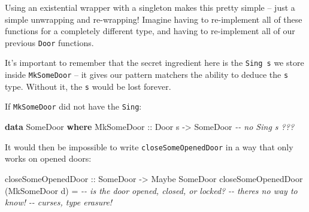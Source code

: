 \documentclass[]{article}
\newenvironment{Shaded}{}{}
\newcommand{\CommentTok}[1]{\textcolor[rgb]{0.38,0.63,0.69}{\textit{#1}}}
\newcommand{\DataTypeTok}[1]{\textcolor[rgb]{0.56,0.13,0.00}{#1}}
\newcommand{\KeywordTok}[1]{\textcolor[rgb]{0.00,0.44,0.13}{\textbf{#1}}}
\newcommand{\NormalTok}[1]{#1}
\newcommand{\OperatorTok}[1]{\textcolor[rgb]{0.40,0.40,0.40}{#1}}
\newcommand{\OtherTok}[1]{\textcolor[rgb]{0.00,0.44,0.13}{#1}}
\begin{document}
\begin{Shaded}
\end{Shaded}

Using an existential wrapper with a singleton makes this pretty simple -- just a
simple unwrapping and re-wrapping! Imagine having to re-implement all of these
functions for a completely different type, and having to re-implement all of our
previous \texttt{Door} functions.

It's important to remember that the secret ingredient here is the
\texttt{Sing\ s} we store inside \texttt{MkSomeDoor} -- it gives our pattern
matchers the ability to deduce the \texttt{s} type. Without it, the \texttt{s}
would be lost forever.

If \texttt{MkSomeDoor} did not have the \texttt{Sing}:

\begin{Shaded}
\begin{Highlighting}[]
\KeywordTok{data} \DataTypeTok{SomeDoor} \KeywordTok{where}
    \DataTypeTok{MkSomeDoor}\OtherTok{  ::} \DataTypeTok{Door}\NormalTok{ s }\OtherTok{{-}>} \DataTypeTok{SomeDoor}       \CommentTok{{-}{-} no Sing s ???}
\end{Highlighting}
\end{Shaded}

It would then be impossible to write \texttt{closeSomeOpenedDoor} in a way that
only works on opened doors:

\begin{Shaded}
\begin{Highlighting}[]
\OtherTok{closeSomeOpenedDoor ::} \DataTypeTok{SomeDoor} \OtherTok{{-}>} \DataTypeTok{Maybe} \DataTypeTok{SomeDoor}
\NormalTok{closeSomeOpenedDoor (}\DataTypeTok{MkSomeDoor}\NormalTok{ d) }\OtherTok{=}
            \CommentTok{{-}{-} is the door opened, closed, or locked?}
            \CommentTok{{-}{-} there\textquotesingle{}s no way to know!}
            \CommentTok{{-}{-} curses, type erasure!}
\end{Highlighting}
\end{Shaded}
\end{document}
